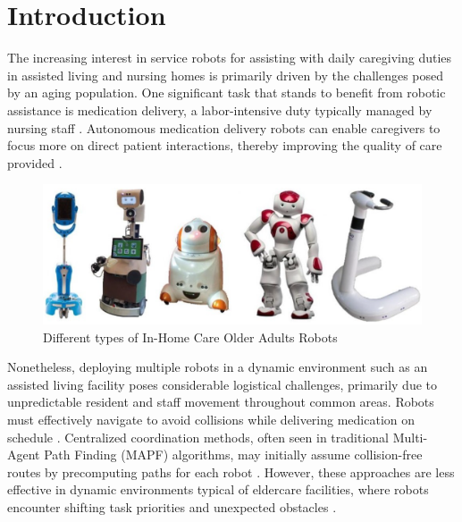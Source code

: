 \documentclass[conference]{IEEEtran}
\begin{document}
\section{Introduction}
The increasing interest in service robots for assisting with daily caregiving duties in assisted living and nursing homes is primarily driven by the challenges posed by an aging population. One significant task that stands to benefit from robotic assistance is medication delivery, a labor-intensive duty typically managed by nursing staff \citep{bao2021}. Autonomous medication delivery robots can enable caregivers to focus more on direct patient interactions, thereby improving the quality of care provided \citep{jeon2016}.

    \label{fig:placeholder}

\begin{figure}
    \centering
    \includegraphics[width=1\linewidth]{In-Home Care for Older Adults.png}
    \caption{Different types of In-Home Care  Older Adults Robots}
    \label{
\section{\textbf{In-Home Care for Older Adults Robots}}

 }
\end{figure}
Nonetheless, deploying multiple robots in a dynamic environment such as an assisted living facility poses considerable logistical challenges, primarily due to unpredictable resident and staff movement throughout common areas. Robots must effectively navigate to avoid collisions while delivering medication on schedule \citep{song2020}. Centralized coordination methods, often seen in traditional Multi-Agent Path Finding (MAPF) algorithms, may initially assume collision-free routes by precomputing paths for each robot \citep{wang2023}. However, these approaches are less effective in dynamic environments typical of eldercare facilities, where robots encounter shifting task priorities and unexpected obstacles \citep{sharon2015}.
\end{document}
